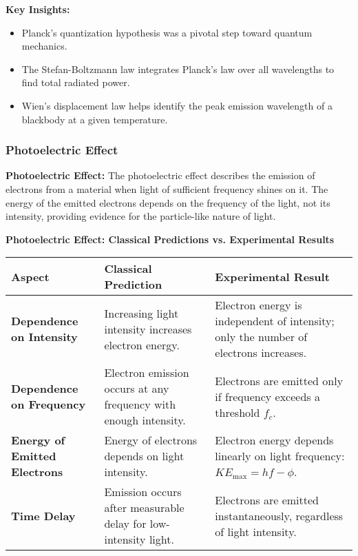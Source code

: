 \documentclass{article}
\newcommand{\conceptbox}[1]{\begin{tcolorbox}[colback=blue!10] #1 \end{tcolorbox}}
\begin{document}
\conceptbox{
\textbf{Key Insights:}
\begin{itemize}
    \item Planck's quantization hypothesis was a pivotal step toward quantum mechanics.
    \item The Stefan-Boltzmann law integrates Planck's law over all wavelengths to find total radiated power.
    \item Wien's displacement law helps identify the peak emission wavelength of a blackbody at a given temperature.
\end{itemize}
}

\subsubsection{Photoelectric Effect}

\conceptbox{
\textbf{Photoelectric Effect:}
The photoelectric effect describes the emission of electrons from a material when light of sufficient frequency shines on it. The energy of the emitted electrons depends on the frequency of the light, not its intensity, providing evidence for the particle-like nature of light.
}

\conceptbox{
\textbf{Photoelectric Effect: Classical Predictions vs. Experimental Results}
\vspace{0.2cm}
\small
\begin{center}
\renewcommand{\arraystretch}{1.2} %
\begin{tabular}{|p{2.8cm}|p{5cm}|p{5cm}|}
\hline
\textbf{Aspect} & \textbf{Classical Prediction} & \textbf{Experimental Result} \\\hline
\textbf{Dependence on Intensity} & Increasing light intensity increases electron energy. & Electron energy is independent of intensity; only the number of electrons increases. \\\hline
\textbf{Dependence on Frequency} & Electron emission occurs at any frequency with enough intensity. & Electrons are emitted only if frequency exceeds a threshold \( f_c \). \\\hline
\textbf{Energy of Emitted Electrons} & Energy of electrons depends on light intensity. & Electron energy depends linearly on light frequency: \( KE_{\text{max}} = hf - \phi \). \\\hline
\textbf{Time Delay} & Emission occurs after measurable delay for low-intensity light. & Electrons are emitted instantaneously, regardless of light intensity. \\\hline
\end{tabular}
\end{center}
\normalsize
}
\end{document}
